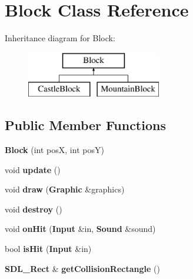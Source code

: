 \section{Block Class Reference}
\label{class_block}
Inheritance diagram for Block\+:\begin{figure}[H]
\begin{center}
\leavevmode
\includegraphics[height=2.000000cm]{class_block}
\end{center}
\end{figure}
\subsection*{Public Member Functions}
\begin{DoxyCompactItemize}
\item 
{\bfseries Block} (int pos\+X, int pos\+Y)\label{class_block_a32b95f86d54a19a55bd7c51a578c28e6}

\item 
void {\bfseries update} ()\label{class_block_a10e17f44df4d273c16190732197578f2}

\item 
void {\bfseries draw} ({\bf Graphic} \&graphics)\label{class_block_a23ca57ffc9fb97f8da3e8620a6718a55}

\item 
void {\bfseries destroy} ()\label{class_block_a27b3bed5a1064d818cd61915f3a380bb}

\item 
void {\bfseries on\+Hit} ({\bf Input} \&in, {\bf Sound} \&sound)\label{class_block_a7263eccd8f8aa3608fa693542add773d}

\item 
bool {\bfseries is\+Hit} ({\bf Input} \&in)\label{class_block_ac4b4ccebb66855f4b8bd234d3bf6d166}

\item 
{\bf S\+D\+L\+\_\+\+Rect} \& {\bfseries get\+Collision\+Rectangle} ()\label{class_block_a719df3c056ce1dc1d93b67275a5c13c1}

\end{DoxyCompactItemize}

